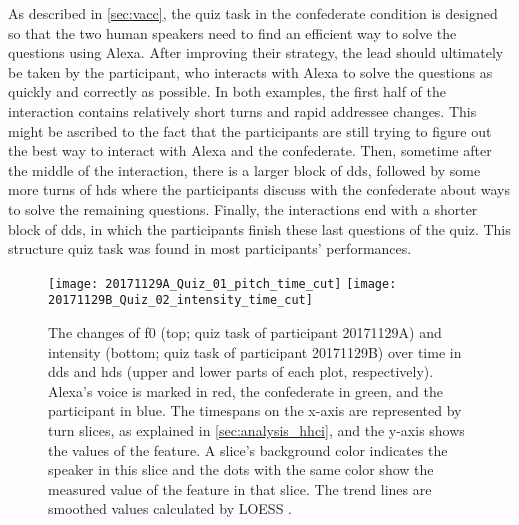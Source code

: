 As described in \cref{sec:vacc}, the quiz task in the confederate condition is designed so that the two human speakers need to find an efficient way to solve the questions using Alexa.
After improving their strategy, the lead should ultimately be taken by the participant, who interacts with Alexa to solve the questions as quickly and correctly as possible.
In both examples, the first half of the interaction contains relatively short turns and rapid addressee changes.
This might be ascribed to the fact that the participants are still trying to figure out the best way to interact with Alexa and the confederate.
Then, sometime after the middle of the interaction, there is a larger block of \ac{dds}, followed by some more turns of \ac{hds} where the participants discuss with the confederate about ways to solve the remaining questions.
Finally, the interactions end with a shorter block of \ac{dds}, in which the participants finish these last questions of the quiz.
This structure quiz task was found in most participants' performances.
%
\begin{figure}
	\vspace{-0.8cm}
	\centering
	\texttt{[image: 20171129A\_Quiz\_01\_pitch\_time\_cut]}
	\texttt{[image: 20171129B\_Quiz\_02\_intensity\_time\_cut]}
	\caption[Temporal comparison of \acs{f0} and intensity trends in \acs{hds} and \acs{dds}]
		{The changes of \acs{f0} (top; quiz task of participant 20171129A) and intensity (bottom; quiz task of participant 20171129B) over time in \ac{dds} and \ac{hds} (upper and lower parts of each plot, respectively).
		Alexa's voice is marked in red, the confederate in green, and the participant in blue.
		The timespans on the x-axis are represented by turn slices, as explained in \cref{sec:analysis_hhci}, and the y-axis shows the values of the feature.
		A slice's background color indicates the speaker in this slice and the dots with the same color show the measured value of the feature in that slice.
		The trend lines are smoothed values calculated by LOESS \citep{Cleveland1988locally}.}
	\label{fig:hds_dds_time}
\end{figure}


